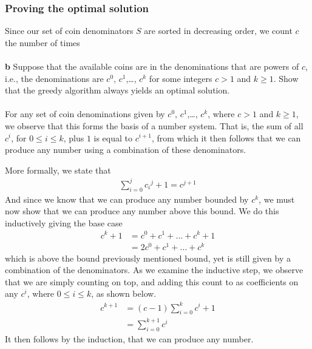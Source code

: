 \documentclass[11pt,english]{article}
\begin{document}
\subsubsection*{Proving the optimal solution}
\noindent Since our set of coin denominators $S$ are sorted in decreasing
order, we count $c$ the number of times
\\\\
\noindent \large{\textbf{b} Suppose that the available coins are in the
denominations that are powers of $c$, i.e., the denominations are $c^0$,
$c^1$,\dots, $c^k$ for some integers $c > 1$ and $k \geq 1$. Show that
the greedy algorithm always yields an optimal solution.}
\\\\
For any set of coin denominations given by $c^0$, $c^1$,\dots, $c^k$, where
$c > 1$ and $k \geq 1$, we observe that this forms the basis of a number
system. That is, the sum of all $c^i$, for $0 \leq i \leq k$, plus $1$ is
equal to $c^{i+1}$, from which it then follows that we can produce any number
using a combination of these denominators.

More formally, we state that
\begin{align}
	\sum_{i=0}^{j} c{_i}^{j} + 1 = c^{j+1}
\end{align}
And since we know that we can produce any number bounded by $c^k$, we must
now show that we can produce any number above this bound. We do this
inductively giving the base case
\begin{align}
	c^k + 1 &= c^0 + c^1 + \dots + c^k + 1\\
	&= 2c^0 + c^1 + \dots + c^k
\end{align}
which is above the bound previously mentioned bound, yet is still given by a
combination of the denominators. As we examine the inductive step, we observe
that we are simply counting on top, and adding this count to as coefficients
on any $c^i$, where $0 \leq i \leq k$, as shown below.
\begin{align}
	c^{k+1} &= (c - 1)\sum_{i=0}^{k}{c^i} + 1\\
	&= \sum_{i=0}^{k+1}{c^i} \nonumber
\end{align}
It then follows by the induction, that we can produce any number.
\end{document}
